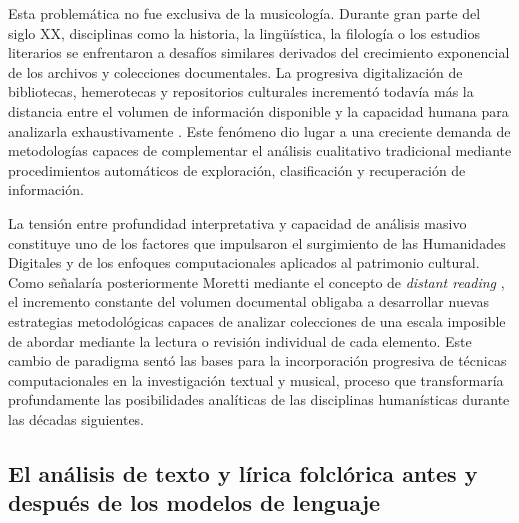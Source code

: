 Esta problemática no fue exclusiva de la musicología. Durante gran parte del siglo XX, disciplinas como la historia, la lingüística, la filología o los estudios literarios se enfrentaron a desafíos similares derivados del crecimiento exponencial de los archivos y colecciones documentales. La progresiva digitalización de bibliotecas, hemerotecas y repositorios culturales incrementó todavía más la distancia entre el volumen de información disponible y la capacidad humana para analizarla exhaustivamente \citep{crane2006big, unesco2003charter}. Este fenómeno dio lugar a una creciente demanda de metodologías capaces de complementar el análisis cualitativo tradicional mediante procedimientos automáticos de exploración, clasificación y recuperación de información.

La tensión entre profundidad interpretativa y capacidad de análisis masivo constituye uno de los factores que impulsaron el surgimiento de las Humanidades Digitales y de los enfoques computacionales aplicados al patrimonio cultural. Como señalaría posteriormente Moretti mediante el concepto de \textit{distant reading} \citep{moretti2013distant}, el incremento constante del volumen documental obligaba a desarrollar nuevas estrategias metodológicas capaces de analizar colecciones de una escala imposible de abordar mediante la lectura o revisión individual de cada elemento. Este cambio de paradigma sentó las bases para la incorporación progresiva de técnicas computacionales en la investigación textual y musical, proceso que transformaría profundamente las posibilidades analíticas de las disciplinas humanísticas durante las décadas siguientes.

\subsection{El análisis de texto y lírica folclórica antes y después de los modelos de lenguaje}


